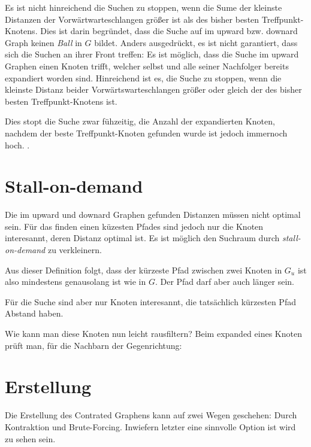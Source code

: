 Es ist nicht hinreichend die Suchen zu stoppen, wenn die Sume der kleinste Distanzen der Vorwärtwarteschlangen größer ist als des bisher besten Treffpunkt-Knotens.
Dies ist darin begründet, dass die Suche auf im upward bzw. downard Graph keinen \emph{Ball} in $G$ bildet.
Anders ausgedrückt, es ist nicht garantiert, dass sich die Suchen an ihrer Front treffen:
Es ist möglich, dass die Suche im upward Graphen einen Knoten trifft, welcher selbst und alle seiner Nachfolger bereits expandiert worden sind.
Hinreichend ist es, die Suche zu stoppen, wenn die kleinste Distanz beider Vorwärtswarteschlangen größer oder gleich der des bisher besten Treffpunkt-Knotens ist.

Dies stopt die Suche zwar fühzeitig, die Anzahl der expandierten Knoten, nachdem der beste Treffpunkt-Knoten gefunden wurde ist jedoch immernoch hoch.
.

\section{Stall-on-demand}

Die im upward und downard Graphen gefunden Distanzen müssen nicht optimal sein.
Für das finden einen küzesten Pfades sind jedoch nur die Knoten interesannt, deren Distanz optimal ist.
Es ist möglich den Suchraum durch \emph{stall-on-demand} zu verkleinern.


Aus dieser Definition folgt, dass der kürzeste Pfad zwischen zwei Knoten in $G_u$ ist also mindestens genausolang ist wie in $G$.
Der Pfad darf aber auch länger sein.


Für die Suche sind aber nur Knoten interesannt, die tatsächlich kürzesten Pfad Abstand haben.

Wie kann man diese Knoten nun leicht rausfiltern?
Beim expanded eines Knoten prüft man, für die Nachbarn der Gegenrichtung:


\section{Erstellung}

Die Erstellung des Contrated Graphens kann auf zwei Wegen geschehen: Durch Kontraktion und Brute-Forcing.
Inwiefern letzter eine sinnvolle Option ist wird  zu sehen sein.

